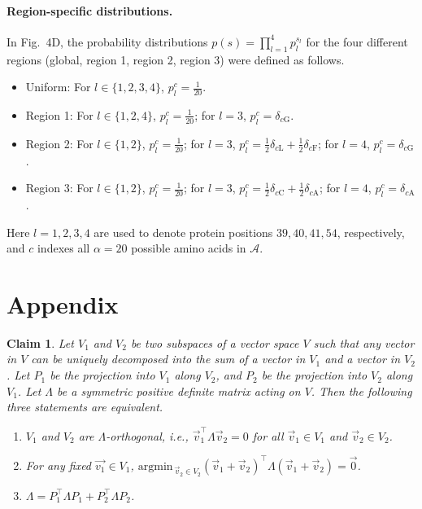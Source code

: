\documentclass{article}
\numberwithin{myclaim}{section}
\newtheorem{claim}{Claim}
\begin{document}
\paragraph*{Region-specific distributions.} In Fig.\ 4D, the probability distributions $p(s) = \prod_{l=1}^4 p_l^{s_l}$ for the four different regions (global, region 1, region 2, region 3) were defined as follows. 
\begin{itemize}
    \item Uniform: For $l \in \{1,2,3,4\}$, $p_l^c = \frac{1}{20}$.
    \item Region 1:  For $l \in \{1,2,4\}$, $p_l^c = \frac{1}{20}$; for $l=3$, $p_l^c = \delta_{c\textrm{G}}$.
    \item Region 2:  For $l \in \{1,2\}$, $p_l^c = \frac{1}{20}$; for $l=3$, $p_l^c = \frac{1}{2} \delta_{c\textrm{L}} + \frac{1}{2} \delta_{c\textrm{F}}$; for $l=4$, $p_l^c = \delta_{c\textrm{G}}$. 
    \item Region 3:  For $l \in \{1,2\}$, $p_l^c = \frac{1}{20}$; for $l=3$, $p_l^c = \frac{1}{2} \delta_{c\textrm{C}} + \frac{1}{2} \delta_{c\textrm{A}}$; for $l=4$, $p_l^c = \delta_{c\textrm{A}}$.  
\end{itemize}
Here $l = 1, 2, 3, 4$ are used to denote protein positions $39, 40, 41, 54$, respectively, and $c$ indexes all $\alpha = 20$ possible amino acids in $\mathcal{A}$. 



\section{Appendix}

\begin{claim} \label{claim:appendix}
    Let $V_1$ and $V_2$ be two subspaces of a vector space $V$ such that any vector in $V$ can be uniquely decomposed into the sum of a vector in $V_1$ and a vector in $V_2$. Let $P_1$ be the projection into $V_1$ along $V_2$, and $P_2$ be the projection into $V_2$ along $V_1$. Let $\Lambda$ be a symmetric positive definite matrix acting on $V$. Then the following three statements are equivalent. 
    \begin{enumerate}
    \item $V_1$ and $V_2$ are $\Lambda$-orthogonal, i.e., $\vec{v}_1^\top \Lambda \vec{v}_2 = 0$ for all $\vec{v}_1 \in V_1$ and $\vec{v}_2 \in V_2$. 
    \item For any fixed $\vec{v_1} \in V_1$, $\mathrm{argmin}_{\,\vec{v}_2 \in V_2} (\vec{v}_1 + \vec{v}_2)^\top \Lambda (\vec{v}_1 + \vec{v}_2) = \vec{0}$. 
    \item $\Lambda = P_1^\top \Lambda P_1 + P_2^\top \Lambda P_2$.
    \end{enumerate} \label{claim:linear_gauges}
\end{claim}
\end{document}
